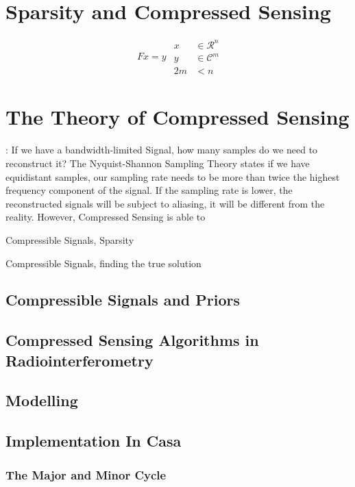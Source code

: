 \section{Sparsity and Compressed Sensing}

\begin{equation}\label{intro:underdetermined}
\begin{split}
Fx = y
\end{split}
\begin{split}
x &\in \mathcal{R}^n\\
y &\in \mathcal{C}^m\\
2m &< n
\end{split}
\end{equation}

\section{The Theory of Compressed Sensing}


: If we have a bandwidth-limited Signal, how many samples do we need to reconstruct it? The Nyquist-Shannon Sampling Theory states if we have equidistant samples, our sampling rate needs to be more than twice the highest frequency component of the signal. If the sampling rate is lower, the reconstructed signals will be subject to aliasing, it will be different from the reality. However, Compressed Sensing is able to 

Compressible Signals, Sparsity


Compressible Signals, finding the true solution

\subsection{Compressible Signals and Priors}


\subsection{Compressed Sensing Algorithms in Radiointerferometry}


\subsection{Modelling}

\subsection{Implementation In Casa}

\subsubsection{The Major and Minor Cycle}
